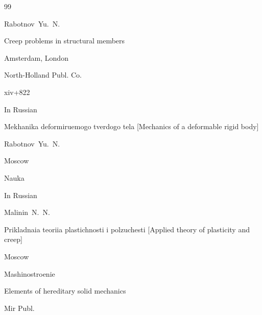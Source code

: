 \begin{thebibliography}{99}




\by Rabotnov~Yu.~N. 

\book Creep problems in structural members

\publaddr Amsterdam, London

\publ  North-Holland Publ. Co.


\totalpages xiv+822





\lang In Russian

\book Mekhanika deformiruemogo tverdogo tela \rm [Mechanics of a deformable rigid body]

\by Rabotnov~Yu.~N.

\publaddr Moscow

\publ Nauka








\lang In Russian

\by Malinin~N.~N.

\book Prikladnaia teoriia plastichnosti i polzuchesti \rm [Applied theory of plasticity and creep]

\publaddr Moscow

\publ Mashinostroenie







\book Elements of hereditary solid mechanics

\publaddr 

\publ Mir Publ.











\end{thebibliography}
